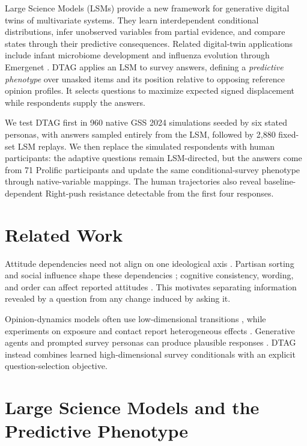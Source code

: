 \documentclass[technote,10pt]{IEEEtran}
\begin{document}
Large Science Models (LSMs) provide a new framework for generative digital twins of multivariate systems. They learn interdependent conditional distributions, infer unobserved variables from partial evidence, and compare states through their predictive consequences. Related digital-twin applications include infant microbiome development \cite{sizemore2024} and influenza evolution through Emergenet \cite{wu2026emergenet}. DTAG applies an LSM to survey answers, defining a \emph{predictive phenotype} over unasked items and its position relative to opposing reference opinion profiles. It selects questions to maximize expected signed displacement while respondents supply the answers.

We test DTAG first in 960 native GSS 2024 simulations seeded by six stated personas, with answers sampled entirely from the LSM, followed by 2,880 fixed-set LSM replays. We then replace the simulated respondents with human participants: the adaptive questions remain LSM-directed, but the answers come from 71 Prolific participants and update the same conditional-survey phenotype through native-variable mappings. The human trajectories also reveal baseline-dependent Right-push resistance detectable from the first four responses.
\section{Related Work}
Attitude dependencies need not align on one ideological axis \cite{converse1964,zaller1992}. Partisan sorting and social influence shape these dependencies \cite{baldassarri2008,dellaposta2015}; cognitive consistency, wording, and order can affect reported attitudes \cite{festinger1957,schwarz1999,taber2006}. This motivates separating information revealed by a question from any change induced by asking it.

Opinion-dynamics models often use low-dimensional transitions \cite{degroot1974,friedkin1990,hegselmann2002}, while experiments on exposure and contact report heterogeneous effects \cite{bail2018,kalla2018,broockman2016}. Generative agents and prompted survey personas can produce plausible responses \cite{argyle2023,park2023}. DTAG instead combines learned high-dimensional survey conditionals with an explicit question-selection objective.

\section{Large Science Models and the Predictive Phenotype}
\end{document}
